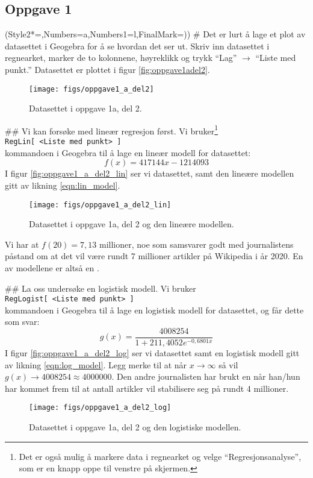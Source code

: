 \subsection*{Oppgave 1}
\begin{easylist}[enumerate]
	\ListProperties(Style2*=,Numbers=a,Numbers1=l,FinalMark={)})
	# Det er lurt å lage et plot av datasettet i Geogebra for å se hvordan det ser ut. Skriv inn datasettet i regnearket, marker de to kolonnene,  høyreklikk og trykk ``Lag'' $\rightarrow$ ``Liste med punkt.'' Datasettet er plottet i figur \eqref{fig:oppgave1adel2}.
	\begin{figure}[th!]
		\centering
		\texttt{[image: figs/oppgave1\_a\_del2]}
		\caption{Datasettet i oppgave 1a, del 2.}
		\label{fig:oppgave1adel2}
	\end{figure}
	## Vi kan forsøke med lineær regresjon først. 
	Vi bruker\footnote{Det er også mulig å markere data i regnearket og velge ``Regresjonsanalyse'', som er en knapp oppe til venstre på skjermen.} \\
	\texttt{RegLin[ <Liste med punkt> ]} \\
	kommandoen i Geogebra til å lage en lineær modell for datasettet:
	\begin{equation}
	\label{eqn:lin_model}
		f(x) = 417144x - 1214093
	\end{equation}
	I figur \eqref{fig:oppgave1_a_del2_lin} ser vi datasettet, samt den lineære modellen gitt av likning \eqref{eqn:lin_model}.
	\begin{figure}[th!]
		\centering
		\texttt{[image: figs/oppgave1\_a\_del2\_lin]}
		\caption{Datasettet i oppgave 1a, del 2 og den lineære modellen.}
		\label{fig:oppgave1_a_del2_lin}
	\end{figure}
	Vi har at $f(20) = 7,13$ millioner, noe som samsvarer godt med journalistens påstand om at det vil være rundt 7 millioner artikler på Wikipedia i år 2020. En av modellene er altså en .

	## La oss undersøke en logistisk modell. 
	Vi bruker \\
	\texttt{RegLogist[ <Liste med punkt> ]} \\
	kommandoen i Geogebra til å lage en logistisk modell for datasettet, og får dette som svar:
	\begin{equation}
	\label{eqn:log_model}
	g(x) = \frac{4008254}{1 + 211,4052e^{-0,6801x}}
	\end{equation}
	I figur \eqref{fig:oppgave1_a_del2_log} ser vi datasettet samt en logistisk modell gitt av likning \eqref{eqn:log_model}.
	Legg merke til at når $x \to \infty$ så vil $g(x) \to 4008254 \approx 4000000$. 
	Den andre journalisten har brukt en  når han/hun har kommet frem til at antall artikler vil stabilisere seg på rundt 4 millioner.
	\begin{figure}[th!]
		\centering
		\texttt{[image: figs/oppgave1\_a\_del2\_log]}
		\caption{Datasettet i oppgave 1a, del 2 og den logistiske modellen.}
		\label{fig:oppgave1_a_del2_log}
	\end{figure}
	

\end{easylist}
